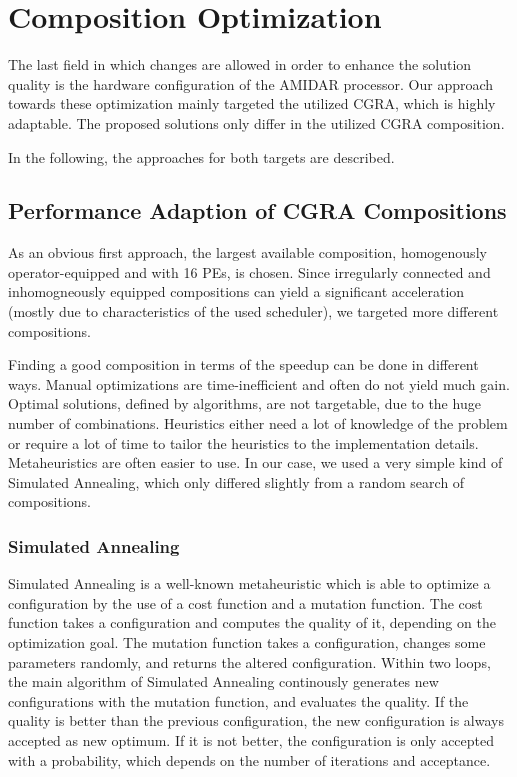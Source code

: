 \chapter{Composition Optimization}
\label{cha:compositionOptimization}

The last field in which changes are allowed in order to enhance the solution quality is the hardware configuration of the AMIDAR processor.
Our approach towards these optimization mainly targeted the utilized CGRA, which is highly adaptable. The proposed solutions only differ in the utilized CGRA composition.

In the following, the approaches for both targets are described.

\section{Performance Adaption of CGRA Compositions}
\label{sec:performanceComposition}
As an obvious first approach, the largest available composition, homogenously operator-equipped and with 16 PEs, is chosen. Since irregularly connected and inhomogneously equipped compositions can yield a significant acceleration (mostly due to characteristics of the used scheduler), we targeted more different compositions.

Finding a good composition in terms of the speedup can be done in different ways. Manual optimizations are time-inefficient and often do not yield much gain. Optimal solutions, defined by algorithms, are not targetable, due to the huge number of combinations. Heuristics either need a lot of knowledge of the problem or require a lot of time to tailor the heuristics to the implementation details. Metaheuristics are often easier to use. In our case, we used a very simple kind of Simulated Annealing, which only differed slightly from a random search of compositions.

\subsection{Simulated Annealing}
\label{subsec:SA}

Simulated Annealing is a well-known metaheuristic which is able to optimize a configuration by the use of a cost function and a mutation function. The cost function takes a configuration and computes the quality of it, depending on the optimization goal. The mutation function takes a configuration, changes some parameters randomly, and returns the altered configuration. Within two loops, the main algorithm of Simulated Annealing continously generates new configurations with the mutation function, and evaluates the quality. If the quality is better than the previous configuration, the new configuration is always accepted as new optimum. If it is not better, the configuration is only accepted with a probability, which depends on the number of iterations and acceptance.

